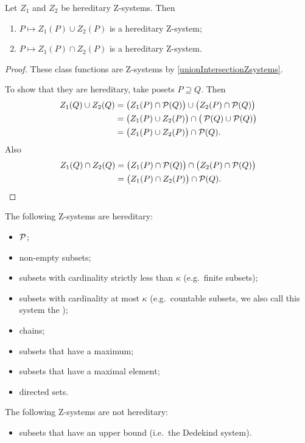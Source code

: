 \begin{lemma}
Let $Z_1$ and $Z_2$ be hereditary $\mathrm{Z}$-systems. Then
\begin{enumerate}
\item $P\mapsto Z_1(P) \cup Z_2(P)$ is a hereditary $\mathrm{Z}$-system;
\item $P\mapsto Z_1(P) \cap Z_2(P)$ is a hereditary $\mathrm{Z}$-system.
\end{enumerate}
\end{lemma}
\begin{proof}
These class functions are $\mathrm{Z}$-systems by \ref{unionIntersectionZsystems}.

To show that they are hereditary, take posets $P \supseteq Q$. Then
\begin{align*}
Z_1(Q) \cup Z_2(Q) &= \big(Z_1(P) \cap \operatorname{\mathcal{P}}(Q)\big)\cup \big( Z_2(P) \cap \operatorname{\mathcal{P}}(Q)\big) \\
&= \big(Z_1(P) \cup Z_2(P)\big) \cap \big(\operatorname{\mathcal{P}}(Q) \cup \operatorname{\mathcal{P}}(Q)\big) \\
&= \big(Z_1(P) \cup Z_2(P)\big) \cap \operatorname{\mathcal{P}}(Q). 
\end{align*}
Also
\begin{align*}
Z_1(Q) \cap Z_2(Q) &= \big(Z_1(P) \cap \operatorname{\mathcal{P}}(Q)\big)\cap \big( Z_2(P) \cap \operatorname{\mathcal{P}}(Q)\big) \\
&= \big(Z_1(P) \cap Z_2(P)\big) \cap \operatorname{\mathcal{P}}(Q).
\end{align*}
\end{proof}

\begin{example}
The following $\mathrm{Z}$-systems are hereditary:
\begin{itemize}
\item $\operatorname{\mathcal{P}}$;
\item non-empty subsets;
\item subsets with cardinality strictly less than $\kappa$ (e.g.\ finite subsets);
\item subsets with cardinality at most $\kappa$ (e.g.\ countable subsets, we also call this system the );
\item chains;
\item subsets that have a maximum;
\item subsets that have a maximal element;
\item directed sets.
\end{itemize}
The following $\mathrm{Z}$-systems are not hereditary:
\begin{itemize}
\item subsets that have an upper bound (i.e.\ the Dedekind system).
\end{itemize}
\end{example}

